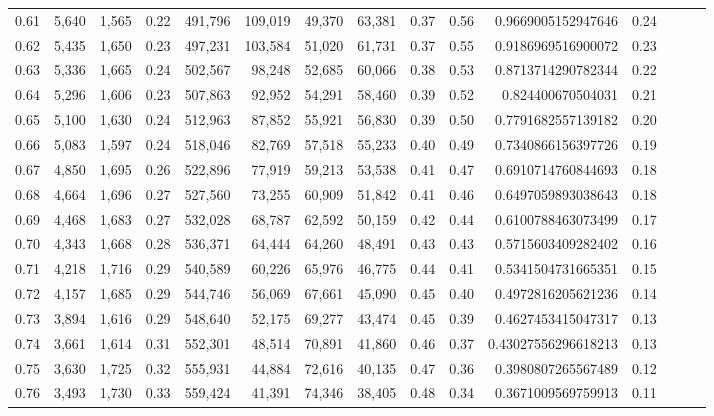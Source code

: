 \begin{tabular}{rrrrrrrrrrrrrrr}
0.61 &  5,640 &  1,565 &  0.22 &  491,796 &  109,019 &   49,370 &   63,381 &  0.37 &  0.56 &    0.9669005152947646 &      0.24 \\
0.62 &  5,435 &  1,650 &  0.23 &  497,231 &  103,584 &   51,020 &   61,731 &  0.37 &  0.55 &    0.9186969516900072 &      0.23 \\
0.63 &  5,336 &  1,665 &  0.24 &  502,567 &   98,248 &   52,685 &   60,066 &  0.38 &  0.53 &    0.8713714290782344 &      0.22 \\
0.64 &  5,296 &  1,606 &  0.23 &  507,863 &   92,952 &   54,291 &   58,460 &  0.39 &  0.52 &     0.824400670504031 &      0.21 \\
0.65 &  5,100 &  1,630 &  0.24 &  512,963 &   87,852 &   55,921 &   56,830 &  0.39 &  0.50 &    0.7791682557139182 &      0.20 \\
0.66 &  5,083 &  1,597 &  0.24 &  518,046 &   82,769 &   57,518 &   55,233 &  0.40 &  0.49 &    0.7340866156397726 &      0.19 \\
0.67 &  4,850 &  1,695 &  0.26 &  522,896 &   77,919 &   59,213 &   53,538 &  0.41 &  0.47 &    0.6910714760844693 &      0.18 \\
0.68 &  4,664 &  1,696 &  0.27 &  527,560 &   73,255 &   60,909 &   51,842 &  0.41 &  0.46 &    0.6497059893038643 &      0.18 \\
0.69 &  4,468 &  1,683 &  0.27 &  532,028 &   68,787 &   62,592 &   50,159 &  0.42 &  0.44 &    0.6100788463073499 &      0.17 \\
0.70 &  4,343 &  1,668 &  0.28 &  536,371 &   64,444 &   64,260 &   48,491 &  0.43 &  0.43 &    0.5715603409282402 &      0.16 \\
0.71 &  4,218 &  1,716 &  0.29 &  540,589 &   60,226 &   65,976 &   46,775 &  0.44 &  0.41 &    0.5341504731665351 &      0.15 \\
0.72 &  4,157 &  1,685 &  0.29 &  544,746 &   56,069 &   67,661 &   45,090 &  0.45 &  0.40 &    0.4972816205621236 &      0.14 \\
0.73 &  3,894 &  1,616 &  0.29 &  548,640 &   52,175 &   69,277 &   43,474 &  0.45 &  0.39 &    0.4627453415047317 &      0.13 \\
0.74 &  3,661 &  1,614 &  0.31 &  552,301 &   48,514 &   70,891 &   41,860 &  0.46 &  0.37 &   0.43027556296618213 &      0.13 \\
0.75 &  3,630 &  1,725 &  0.32 &  555,931 &   44,884 &   72,616 &   40,135 &  0.47 &  0.36 &    0.3980807265567489 &      0.12 \\
0.76 &  3,493 &  1,730 &  0.33 &  559,424 &   41,391 &   74,346 &   38,405 &  0.48 &  0.34 &    0.3671009569759913 &      0.11 \\

\end{tabular}
